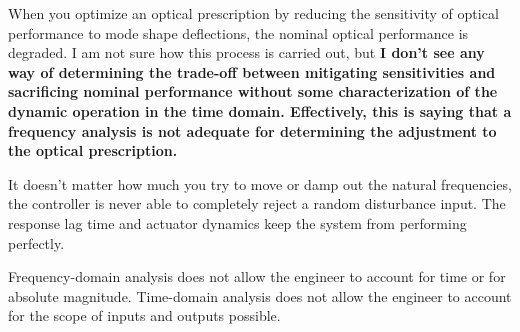 \documentclass{aiaa-tc}
\begin{document}
When you optimize an optical prescription by reducing the sensitivity of optical performance to mode shape deflections, the nominal optical performance is degraded. I am not sure how this process is carried out, but \bf{I don't see any way of determining the trade-off between mitigating sensitivities and sacrificing nominal performance without some characterization of the dynamic operation in the time domain}. Effectively, this is saying that a frequency analysis is not adequate for determining the adjustment to the optical prescription.

It doesn't matter how much you try to move or damp out the natural frequencies, the controller is never able to completely reject a random disturbance input. The response lag time and actuator dynamics keep the system from performing perfectly.

Frequency-domain analysis does not allow the engineer to account for time or for absolute magnitude. Time-domain analysis does not allow the engineer to account for the scope of inputs and outputs possible.

%
%
%
%
% 
% 
\end{document}

